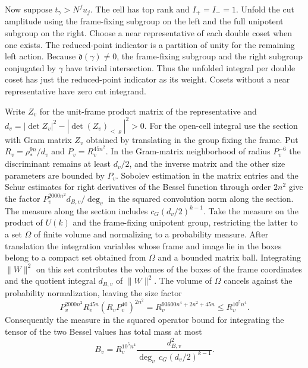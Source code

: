 Now suppose \(t_\gamma>N^fu_j\). The cell has top rank and \(I_+=I_-=1\).
Unfold the cut amplitude using the frame-fixing subgroup on the left
and the full unipotent subgroup on the right.
Choose a near representative of each double coset when one exists.
The reduced-point indicator is a partition of unity for the remaining
left action. Because \(\mathfrak d(\gamma)\ne0\), the frame-fixing
subgroup and the right subgroup conjugated by \(\gamma\) have trivial
intersection. Thus the unfolded integral per double coset has just
the reduced-point indicator as its weight.
Cosets without a near representative have zero cut integrand.

Write \(Z_v\) for the unit-frame product matrix of the representative
and \(d_v=|\det Z_v|^2-|\det (Z_v)_{<\varrho}|^2>0\).
For the open-cell integral use the section with Gram matrix \(Z_v\)
obtained by translating in the group fixing the frame.
Put \(R_v=\rho_\ast^{9n}/d_v\) and \(P_v=R_v^{45n^2}\).
In the Gram-matrix neighborhood of radius \(P_v^{-6}\) the
discriminant remains at least \(d_v/2\), and the inverse matrix and
the other size parameters are bounded by \(P_v\).
Sobolev estimation in the matrix entries and the Schur estimates for
right derivatives of the Bessel function through order \(2n^2\)
give the factor \(P_v^{2000n^2}d_{B,v}/\deg_v\) in the squared
convolution norm along the section. The measure along the section
includes \(c_G(d_v/2)^{k-1}\).
Take the measure on the product of \(U(k)\) and the frame-fixing
unipotent group, restricting the latter to a set \(\Omega\) of finite
volume and normalizing to a probability measure.
After translation the integration variables whose frame and image lie
in the boxes belong to a compact set obtained from \(\Omega\) and a
bounded matrix ball. Integrating \(\|W\|^2\) on this set contributes the
volumes of the boxes of the frame coordinates and the quotient integral
\(d_{B,v}\) of \(\|W\|^2\). The volume of \(\Omega\) cancels against the
probability normalization, leaving the size factor
\[
 P_v^{2000n^2}R_v^{45n}
        (R_vP_v^{40})^{2n^2}
 =R_v^{93600n^4+2n^2+45n}
 \le R_v^{10^5 n^4} .
\]
Consequently the measure in the squared operator bound for integrating
the tensor of the two Bessel values has total mass at most
\[
 B_v=R_v^{10^5 n^4}
      \frac{d_{B,v}^2}{\deg_v\,c_G(d_v/2)^{k-1}} .
\]

